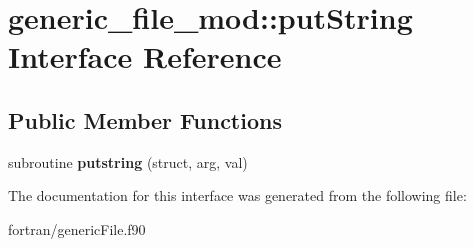 \hypertarget{interfacegeneric__file__mod_1_1put_string}{}\section{generic\+\_\+file\+\_\+mod\+:\+:put\+String Interface Reference}
\label{interfacegeneric__file__mod_1_1put_string}
\subsection*{Public Member Functions}
\begin{DoxyCompactItemize}
\item 
\mbox{\label{interfacegeneric__file__mod_1_1put_string_ab1eeb5a34e9b276e05ba771749ba4c48}} 
subroutine {\bfseries putstring} (struct, arg, val)
\end{DoxyCompactItemize}


The documentation for this interface was generated from the following file\+:\begin{DoxyCompactItemize}
\item 
fortran/generic\+File.\+f90\end{DoxyCompactItemize}
